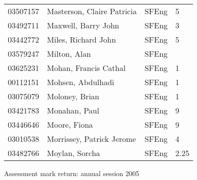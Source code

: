 \documentclass[a4paper]{article}
\begin{document}
\begin{tabular}{llll}
03507157&Masterson, Claire Patricia&SFEng&5\\
03492711&Maxwell, Barry John&SFEng&3\\
03442772&Miles, Richard John&SFEng&5\\
03579247&Milton, Alan&SFEng&\\
03625231&Mohan, Francis Cathal&SFEng&1\\
00112151&Mohsen, Abdulhadi&SFEng&1\\
03075079&Moloney, Brian&SFEng&1\\
03421783&Monahan, Paul&SFEng&9\\
03446646&Moore, Fiona&SFEng&9\\
03010538&Morrissey, Patrick Jerome&SFEng&4\\
03482766&Moylan, Sorcha&SFEng&2.25\\
\end{tabular}
\newpage
\begin{center}
Assessment mark return: annual session 2005
\end{center}
\end{document}
